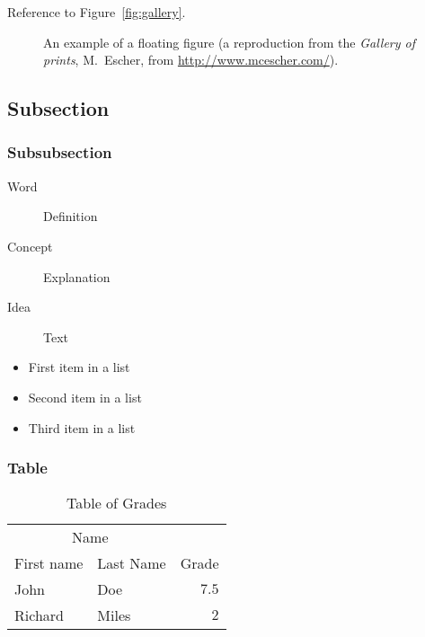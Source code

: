 \documentclass[
12pt, %
a4paper, %
oneside, %
headinclude,footinclude, %
BCOR5mm, %
german]{scrartcl}
\begin{document}
Reference to Figure~\vref{fig:gallery}. %

\begin{figure}[tb]
\centering 
\caption[An example of a floating figure]{An example of a floating figure (a reproduction from the \emph{Gallery of prints}, M.~Escher, from \url{http://www.mcescher.com/}).} %
\label{fig:gallery} 
\end{figure}

\lipsum[10] %


\subsection{Subsection}

\lipsum[11] %

\subsubsection{Subsubsection}

\lipsum[12] %

\begin{description}
\item[Word] Definition
\item[Concept] Explanation
\item[Idea] Text
\end{description}

\lipsum[12] %

\begin{itemize}[noitemsep] %
\item First item in a list
\item Second item in a list
\item Third item in a list
\end{itemize}

\subsubsection{Table}

\lipsum[13] %

\begin{table}[hbt]
\caption{Table of Grades}
\centering
\begin{tabular}{llr}
\toprule
\multicolumn{2}{c}{Name} \\
\cmidrule(r){1-2}
First name & Last Name & Grade \\
\midrule
John & Doe & $7.5$ \\
Richard & Miles & $2$ \\
\bottomrule
\end{tabular}
\label{tab:label}
\end{table}
\end{document}
